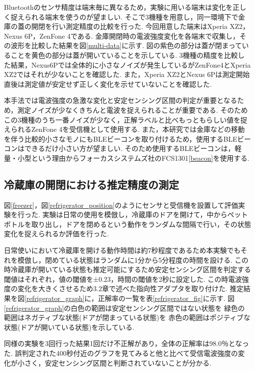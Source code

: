 \documentclass[Japanese]{dicomopapers}
\begin{document}
Bluetoothのセンサ精度は端末毎に異なるため，実験に用いる端末は変化を正しく捉えられる端末を使うのが望ましい.
そこで3機種を用意し，同一環境下で金庫の蓋の開閉を行い測定精度の比較を行った.
今回用意した端末はXperia XZ2，Nexus 6P，ZenFone 4である.
金庫開閉時の電波強度変化を各端末で収集し，その波形を比較した結果を図\ref{multi-data}に示す.
図の紫色の部分は蓋が閉まっていることを黄色の部分は蓋が開いていることを示している.
3機種の精度を比較した結果，Nexus6Pでは全体的に小さなノイズが発生しているがZenFone4とXperia XZ2ではそれが少ないことを確認した.
また，Xperia XZ2とNexus 6Pは測定開始直後は測定値が安定せず正しく変化を示せていないことを確認した.

本手法では電波強度の急激な変化と安定センシング区間の判定が重要となるため，測定ノイズが少なくきちんと電波を捉えられることが重要である.
そのためこの3機種のうち一番ノイズが少なく，正解ラベルと比べもっともらしい値を捉えられるZenFone 4を受信機として使用する.
また，本研究では金庫などの移動を伴う比較的小さなモノにもBLEビーコンを取り付けるため，使用するBLEビーコンはできるだけ小さい方が望ましい.
そのため使用するBLEビーコンは，軽量・小型という理由からフォーカスシステムズ社のFCS1301\ref{beacon}を使用する.


\subsection{冷蔵庫の開閉における推定精度の測定}
図\ref{freezer}，図\ref{refrigerator_position}のようにセンサと受信機を設置して評価実験を行った.
実験は日常の使用を模倣し，冷蔵庫のドアを開けて，中からペットボトルを取り出し，ドアを閉めるという動作をランダムな間隔で行い，その状態変化を捉えられるか評価を行った.

日常使いにおいて冷蔵庫を開ける動作時間は約7秒程度であるため本実験でもそれを模倣し，閉めている状態はランダムに1分から5分程度の時間を設ける.
この時冷蔵庫が開いている状態も推定可能にするため安定センシング区間を判定する閾値はそれぞれ，値の閾値を±0.23，時間の閾値を2秒に設定した.
この時電波強度の変化を大きくさせるため3.2章で述べた指向性アダプタを取り付けた.
推定結果を図\ref{refrigerator_graph}に，正解率の一覧を表\ref{refrigerator_fig}に示す.
図\ref{refrigerator_graph}の白色の範囲は安定センシング区間ではない状態を 緑色の範囲はネガティブな状態(ドアが閉まっている状態)を 赤色の範囲はポジティブな状態(ドアが開いている状態)を示している.

同様の実験を3回行った結果1回だけ不正解があり，全体の正解率は98.0％となった.
誤判定された400秒付近のグラフを見てみると他と比べて受信電波強度の変化が小さく，安定センシング区間と判断されていないことが分かる.
\end{document}
